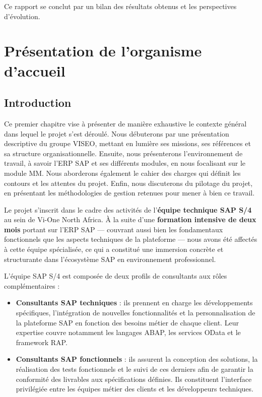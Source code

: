 \documentclass[12pt,a4paper,oneside]{report}
\begin{document}
Ce rapport se conclut par un bilan des résultats obtenus et les perspectives d'évolution.

\endgroup
\chapter{Présentation de l’organisme d’accueil}\label{ch:contexte}
\section{Introduction}\label{ch1:introduction}

Ce premier chapitre vise \`a pr\'esenter de mani\`ere exhaustive le contexte g\'en\'eral
dans lequel le projet s'est d\'eroul\'e. Nous d\'ebuterons par une pr\'esentation descriptive
du groupe VISEO, mettant en lumi\`ere ses missions, ses r\'ef\'erences et sa structure
organisationnelle. Ensuite, nous pr\'esenterons l'environnement de travail, \`a savoir
l'ERP SAP et ses diff\'erents modules, en nous focalisant sur le module MM. Nous aborderons
\'egalement le cahier des charges qui d\'efinit les contours et les attentes du projet.
Enfin, nous discuterons du pilotage du projet, en pr\'esentant les m\'ethodologies de gestion
retenues pour mener \`a bien ce travail.

\vspace{0.3cm}

Le projet s'inscrit dans le cadre des activit\'es de l'\textbf{\'equipe technique SAP S/4}
au sein de Vi-One North Africa. \`A la suite d'une \textbf{formation intensive de deux mois}
portant sur l'ERP SAP --- couvrant aussi bien les fondamentaux fonctionnels que les aspects
techniques de la plateforme --- nous avons \'et\'e affect\'es \`a cette \'equipe sp\'ecialis\'ee,
ce qui a constitu\'e une immersion concr\`ete et structurante dans l'\'ecosyst\`eme SAP
en environnement professionnel.

\vspace{0.2cm}

L'\'equipe SAP S/4 est compos\'ee de deux profils de consultants aux r\^oles compl\'ementaires :

\begin{itemize}[label=\textbullet, itemsep=0.2em]
  \item \textbf{Consultants SAP techniques} : ils prennent en charge les d\'eveloppements sp\'ecifiques, l'int\'egration de nouvelles fonctionnalit\'es et la personnalisation de la plateforme SAP en fonction des besoins m\'etier de chaque client. Leur expertise couvre notamment les langages ABAP, les services OData et le framework RAP.
  \item \textbf{Consultants SAP fonctionnels} : ils assurent la conception des solutions, la r\'ealisation des tests fonctionnels et le suivi de ces derniers afin de garantir la conformit\'e des livrables aux sp\'ecifications d\'efinies. Ils constituent l'interface privil\'egi\'ee entre les \'equipes m\'etier des clients et les d\'eveloppeurs techniques.
\end{itemize}
\end{document}
